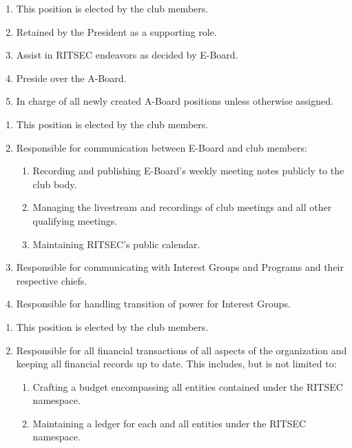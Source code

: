 
\begin{enumerate}
  \item This position is elected by the club members.
  \item Retained by the President as a supporting role.
  \item Assist in RITSEC endeavors as decided by E-Board.
  \item Preside over the A-Board.
  \item In charge of all newly created A-Board positions unless otherwise assigned.
\end{enumerate}


\begin{enumerate}
  \item This position is elected by the club members.
  \item Responsible for communication between E-Board and club members:
  \begin{enumerate}
    \item Recording and publishing E-Board's weekly meeting notes publicly to the club body.
    \item Managing the livestream and recordings of club meetings and all other qualifying meetings. 
    \item Maintaining RITSEC's public calendar.
  \end{enumerate}
  \item Responsible for communicating with Interest Groups and Programs and their respective chiefs.
  \item Responsible for handling transition of power for Interest Groups.
\end{enumerate}


\begin{enumerate}
  \item This position is elected by the club members.
  \item Responsible for all financial transactions of all aspects of the organization and keeping all financial records up to date. This includes, but is not limited to:
  \begin{enumerate} 
    \item Crafting a budget encompassing all entities contained under the RITSEC namespace.
    \item Maintaining a ledger for each and all entities under the RITSEC namespace.
  \end{enumerate}
\end{enumerate}

